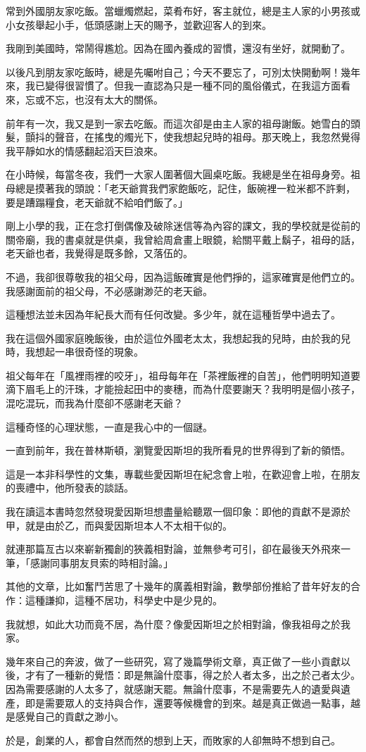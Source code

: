 \begin{Acknowledgement}

常到外國朋友家吃飯。當蠟燭燃起，菜肴布好，客主就位，總是主人家的小男孩或小女孩舉起小手，低頭感謝上天的賜予，並歡迎客人的到來。

我剛到美國時，常鬧得尷尬。因為在國內養成的習慣，還沒有坐好，就開動了。

以後凡到朋友家吃飯時，總是先囑咐自己；今天不要忘了，可別太快開動啊！幾年來，我已變得很習慣了。但我一直認為只是一種不同的風俗儀式，在我這方面看來，忘或不忘，也沒有太大的關係。

前年有一次，我又是到一家去吃飯。而這次卻是由主人家的祖母謝飯。她雪白的頭髮，顫抖的聲音，在搖曳的燭光下，使我想起兒時的祖母。那天晚上，我忽然覺得我平靜如水的情感翻起滔天巨浪來。

在小時候，每當冬夜，我們一大家人圍著個大圓桌吃飯。我總是坐在祖母身旁。祖母總是摸著我的頭說：「老天爺賞我們家飽飯吃，記住，飯碗裡一粒米都不許剩，要是蹧蹋糧食，老天爺就不給咱們飯了。」

剛上小學的我，正在念打倒偶像及破除迷信等為內容的課文，我的學校就是從前的關帝廟，我的書桌就是供桌，我曾給周倉畫上眼鏡，給關平戴上鬍子，祖母的話，老天爺也者，我覺得是既多餘，又落伍的。

不過，我卻很尊敬我的祖父母，因為這飯確實是他們掙的，這家確實是他們立的。我感謝面前的祖父母，不必感謝渺茫的老天爺。

這種想法並未因為年紀長大而有任何改變。多少年，就在這種哲學中過去了。

我在這個外國家庭晚飯後，由於這位外國老太太，我想起我的兒時，由於我的兒時，我想起一串很奇怪的現象。

祖父每年在「風裡雨裡的咬牙」，祖母每年在「茶裡飯裡的自苦」，他們明明知道要滴下眉毛上的汗珠，才能撿起田中的麥穗，而為什麼要謝天？我明明是個小孩子，混吃混玩，而我為什麼卻不感謝老天爺？

這種奇怪的心理狀態，一直是我心中的一個謎。

一直到前年，我在普林斯頓，瀏覽愛因斯坦的我所看見的世界得到了新的領悟。

這是一本非科學性的文集，專載些愛因斯坦在紀念會上啦，在歡迎會上啦，在朋友的喪禮中，他所發表的談話。

我在讀這本書時忽然發現愛因斯坦想盡量給聽眾一個印象：即他的貢獻不是源於甲，就是由於乙，而與愛因斯坦本人不太相干似的。

就連那篇亙古以來嶄新獨創的狹義相對論，並無參考可引，卻在最後天外飛來一筆，「感謝同事朋友貝索的時相討論。」

其他的文章，比如奮鬥苦思了十幾年的廣義相對論，數學部份推給了昔年好友的合作：這種謙抑，這種不居功，科學史中是少見的。

我就想，如此大功而竟不居，為什麼？像愛因斯坦之於相對論，像我祖母之於我家。

幾年來自己的奔波，做了一些研究，寫了幾篇學術文章，真正做了一些小貢獻以後，才有了一種新的覺悟：即是無論什麼事，得之於人者太多，出之於己者太少。因為需要感謝的人太多了，就感謝天罷。無論什麼事，不是需要先人的遺愛與遺產，即是需要眾人的支持與合作，還要等候機會的到來。越是真正做過一點事，越是感覺自己的貢獻之渺小。

於是，創業的人，都會自然而然的想到上天，而敗家的人卻無時不想到自己。

\end{Acknowledgement}